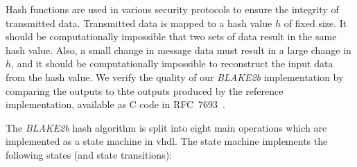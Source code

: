 \documentclass[%
	a4paper,
]
{article}
\begin{document}
Hash functions are used in various security protocols to ensure the integrity
of transmitted data. Transmitted data is mapped to a hash value $h$ of fixed
size. It should be computationally impossible that two sets of data
result in the same hash value. Also, a small change in message data must
result in a large change in $h$, and it should be computationally impossible to
reconstruct the input data from the hash value.
%
We verify the quality of our \emph{BLAKE2b} implementation by comparing the
outputs to thte outputs produced by the reference implementation,
available as C code in RFC~7693~\autocite[16-26]{rfc7693}.

The \emph{BLAKE2b} hash algorithm is split into eight main operations which
are implemented as a state machine in \gls{vhdl}. The state machine implements
the following states (and state transitions):
\end{document}
